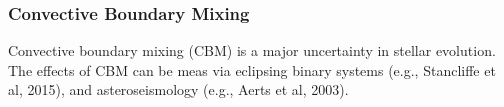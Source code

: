 {\color{purple}
\subsubsection{Convective Boundary Mixing}
}

Convective boundary mixing (CBM) is a major uncertainty in stellar evolution. The effects of CBM can be meas via eclipsing binary systems (e.g., Stancliffe et al, 2015), and asteroseismology (e.g., Aerts et al, 2003).


